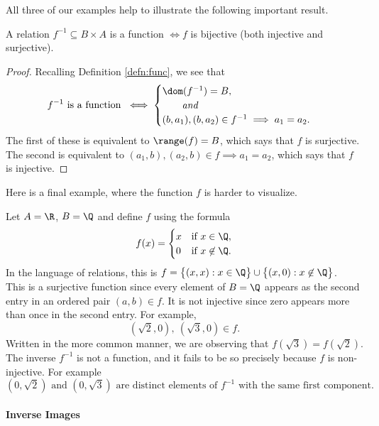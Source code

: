 \noindent All three of our examples help to illustrate the following important result.

\begin{thm}\label{thm:finverse}
A relation $f^{-1}\subseteq B\times A$ is a function $\iff f$ is bijective (both injective and surjective).
\end{thm}

\begin{proof}
Recalling Definition \ref{defn:func}, we see that
\[f^{-1}\text{ is a function }\iff\begin{cases}
\dom(f^{-1})=B,\\
\qquad\text{\emph{and}}\\
(b,a_1),(b,a_2)\in f^{-1}\implies a_1=a_2.
\end{cases}\]
The first of these is equivalent to $\range(f)=B$, which says that $f$ is surjective.\\
The second is equivalent to $(a_1,b),(a_2,b)\in f\implies a_1=a_2$, which says that $f$ is injective.
\end{proof}

\noindent Here is a final example, where the function $f$ is harder to visualize.

\begin{example}
Let $A=\R$, $B=\Q$ and define $f$ using the formula 
\[f(x)=\begin{cases}
x&\text{if }x\in\Q,\\
0&\text{if }x\not\in\Q.
\end{cases}\]
In the language of relations, this is $f=\bigl\{(x,x):x\in\Q\bigr\}\cup\bigl\{(x,0):x\not\in\Q\bigr\}$.\\[2pt]
This is a surjective function since every element of $B=\Q$ appears as the second entry in an ordered pair $(a,b)\in f$. It is not injective since zero appears more than once in the second entry. For example,
\[(\sqrt 2,0),\ (\sqrt 3,0)\in f.\]
Written in the more common manner, we are observing that $f(\sqrt 3)=f(\sqrt 2)$.\\[2pt]
The inverse $f^{-1}$ is not a function, and it fails to be so precisely because $f$ is non-injective. For example
\[(0,\sqrt 2)\text{ and } (0,\sqrt 3)\text{ are distinct elements of $f^{-1}$ with the same  first component.}\]
\end{example}

\paragraph{Inverse Images}


